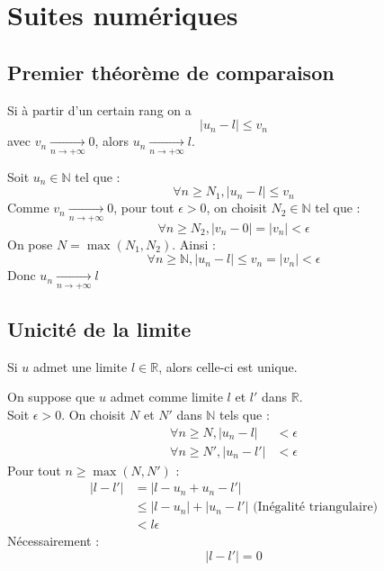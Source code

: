 \documentclass[../main.tex]{subfiles}
\begin{document}
\setcounter{chapter}{13}
\chapter{Suites numériques}
\tableofcontents
\clearpage

\setcounter{section}{17}
\section{Premier théorème de comparaison}
\begin{tcolorbox}[title=Théorème 14.18, title filled=false, colframe=orange, colback=orange!10!white]
    Si à partir d'un certain rang on a 
    $$|u_n - l| \leq v_n$$
    avec $v_n \underset{n \to +\infty}{\longrightarrow} 0$, alors $u_n \underset{n \to +\infty}{\longrightarrow} l$. 
\end{tcolorbox}

Soit $u_n \in \mathbb{N}$ tel que : 
$$\forall n \geq N_1, |u_n - l| \leq v_n$$
Comme $v_n \underset{n \to +\infty}{\longrightarrow} 0$, pour tout $\epsilon > 0$, on choisit $N_2 \in \mathbb{N}$ tel que :
$$\forall n \geq N_2, |v_n - 0| = |v_n| < \epsilon$$
On pose $N = \max(N_1, N_2)$. Ainsi : 
$$\forall n \geq \mathbb{N}, |u_n - l| \leq v_n = |v_n| < \epsilon$$
Donc $\boxed{u_n \underset{n \to +\infty}{\longrightarrow} l}$

\setcounter{section}{21}
\section{Unicité de la limite}
\begin{tcolorbox}[title=Propostion 14.22, title filled=false, colframe=lightblue, colback=lightblue!10!white]
    Si $u$ admet une limite $l \in \mathbb{R}$, alors celle-ci est unique. 
\end{tcolorbox}

On suppose que $u$ admet comme limite $l$ et $l'$ dans $\mathbb{R}$. \\
Soit $\epsilon > 0$. On choisit $N$ et $N'$ dans $\mathbb{N}$ tels que : 
\begin{align*}
    \forall n \geq N, |u_n - l| &< \epsilon \\
    \forall n \geq N', |u_n - l'| &< \epsilon
\end{align*}
Pour tout $n \geq \max(N, N')$ : 
\begin{align*}
    |l - l'| &= |l - u_n + u_n - l'| \\
    &\leq |l - u_n| + |u_n - l'| \text{ (Inégalité triangulaire)} \\
    &< l\epsilon
\end{align*}
Nécessairement : 
$$|l - l'| = 0$$
\end{document}
